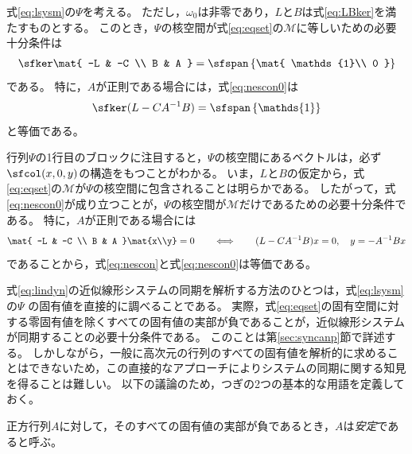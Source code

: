 \documentclass[tombow,dvipdfmx]{corona-a5}
\begin{document}
\begin{補題}\label{lem:nescon}
式\ref{eq:lsysm}の$\Psi$を考える。
ただし，$\omega_0$は非零であり，$L$と$B$は式\ref{eq:LBker}を満たすものとする。
このとき，$\Psi$の核空間が式\ref{eq:eqset}の$\mathcal{M}$に等しいための必要十分条件は
\begin{align}\label{eq:nescon0}
\sfker \mat{
-L & -C \\
B & A
}
= \sfspan
\left\{
\mat{
\mathds{1}\\
0
}
\right\}
\end{align}
である。
特に，$A$が正則である場合には，式\ref{eq:nescon0}は
\begin{align}\label{eq:nescon}
\sfker (L-CA^{-1}B) = \sfspan
\left\{
\mathds{1}
\right\}
\end{align}
と等価である。
\end{補題}

\begin{証明}
行列$\Psi$の1行目のブロックに注目すると，$\Psi$の核空間にあるベクトルは，必ず$\sfcol(x,0,y)$の構造をもつことがわかる。
いま，$L$と$B$の仮定から，式\ref{eq:eqset}の$\mathcal{M}$が$\Psi$の核空間に包含されることは明らかである。
したがって，式\ref{eq:nescon0}が成り立つことが，$\Psi$の核空間が$\mathcal{M}$だけであるための必要十分条件である。
特に，$A$が正則である場合には
\begin{align*}
\mat{
-L & -C \\
B & A
}\mat{x\\y}
=0
\qquad
\Longleftrightarrow
\qquad
(L-CA^{-1}B)x=0,
\quad
y=-A^{-1}Bx
\end{align*}
であることから，式\ref{eq:nescon}と式\ref{eq:nescon0}は等価である。
\end{証明}




式\ref{eq:lindyn}の近似線形システムの同期を解析する方法のひとつは，式\ref{eq:lsysm}の$\Psi$
の固有値を直接的に調べることである。
実際，式\ref{eq:eqset}の固有空間に対する零固有値を除くすべての固有値の実部が負であることが，近似線形システムが同期することの必要十分条件である。
このことは第\ref{sec:syncanp}節で詳述する。
しかしながら，一般に高次元の行列のすべての固有値を解析的に求めることはできないため，この直接的なアプローチによりシステムの同期に関する知見を得ることは難しい。
以下の議論のため，つぎの2つの基本的な用語を定義しておく。

\begin{定義}\label{def:matsta}
正方行列$A$に対して，そのすべての固有値の実部が負であるとき，$A$は\emph{安定}であると呼ぶ。
\end{定義}
\end{document}
